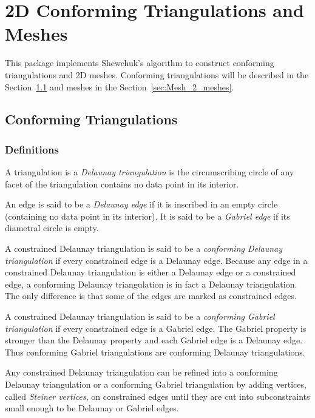 \chapter{2D Conforming Triangulations and Meshes}
\label{user_chapter_2D_Meshes}

\minitoc

This package implements Shewchuk's algorithm to construct conforming
triangulations and 2D meshes.  Conforming triangulations will be
described in the Section~\ref{sec:Mesh_2_conforming_triangulation} and
meshes in the Section~\ref{sec:Mesh_2_meshes}.

\section{Conforming Triangulations}
\label{sec:Mesh_2_conforming_triangulation}

\subsection{Definitions}
\label{sec:Mesh_2_conforming_definitions}

A triangulation is a \emph{Delaunay triangulation} is the circumscribing
circle of any facet of the triangulation contains no data point in its
interior.

An edge is said to be a \emph{Delaunay edge} if it is inscribed in an empty
circle (containing no data point in its interior). It is said to be a
\emph{Gabriel edge} if its diametral circle is empty.

A constrained Delaunay triangulation is said to be a \emph{conforming
  Delaunay triangulation} if every constrained edge is a Delaunay edge.
Because any edge in a constrained Delaunay triangulation is either a
Delaunay edge or a constrained edge, a conforming Delaunay triangulation is
in fact a Delaunay triangulation. The only difference is that some of the
edges are marked as constrained edges.

A constrained Delaunay triangulation is said to be a \emph{conforming
  Gabriel triangulation} if every constrained edge is a Gabriel edge. The
Gabriel property is stronger than the Delaunay property and each Gabriel
edge is a Delaunay edge. Thus conforming Gabriel triangulations are
conforming Delaunay triangulations.

Any constrained Delaunay triangulation can be refined into a
conforming Delaunay triangulation or a conforming Gabriel
triangulation by adding vertices, called \emph{Steiner vertices}, on
constrained edges until they are cut into subconstraints small enough
to be Delaunay or Gabriel edges.

